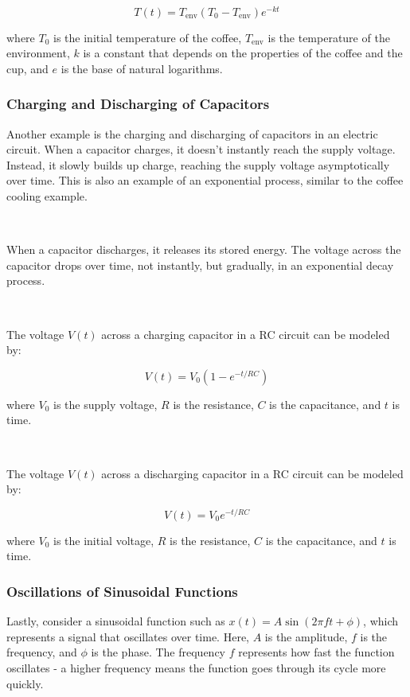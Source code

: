 \documentclass[11pt]{article}
\begin{document}
\

\[ T(t) = T_{\text{env}}  (T_0 - T_{\text{env}}) e^{-kt} \]

where $T_0$ is the initial temperature of the coffee, $T_{\text{env}}$ is the temperature of the environment, $k$ is a constant that depends on the properties of the coffee and the cup, and $e$ is the base of natural logarithms.



\subsubsection*{Charging and Discharging of Capacitors}

Another example is the charging and discharging of capacitors in an electric circuit. When a capacitor charges, it doesn't instantly reach the supply voltage. Instead, it slowly builds up charge, reaching the supply voltage asymptotically over time. This is also an example of an exponential process, similar to the coffee cooling example.

\ 

When a capacitor discharges, it releases its stored energy. The voltage across the capacitor drops over time, not instantly, but gradually, in an exponential decay process.

\ 

The voltage $V(t)$ across a charging capacitor in a RC circuit can be modeled by:

\[ V(t) = V_0 (1 - e^{-t/RC}) \]

where $V_0$ is the supply voltage, $R$ is the resistance, $C$ is the capacitance, and $t$ is time.

\ 


The voltage $V(t)$ across a discharging capacitor in a RC circuit can be modeled by:

\[ V(t) = V_0 e^{-t/RC} \]

where $V_0$ is the initial voltage, $R$ is the resistance, $C$ is the capacitance, and $t$ is time.

\subsubsection*{Oscillations of Sinusoidal Functions}

Lastly, consider a sinusoidal function such as $x(t) = A \sin(2 \pi f t + \phi)$, which represents a signal that oscillates over time. Here, $A$ is the amplitude, $f$ is the frequency, and $\phi$ is the phase. The frequency $f$ represents how fast the function oscillates - a higher frequency means the function goes through its cycle more quickly.
\end{document}
